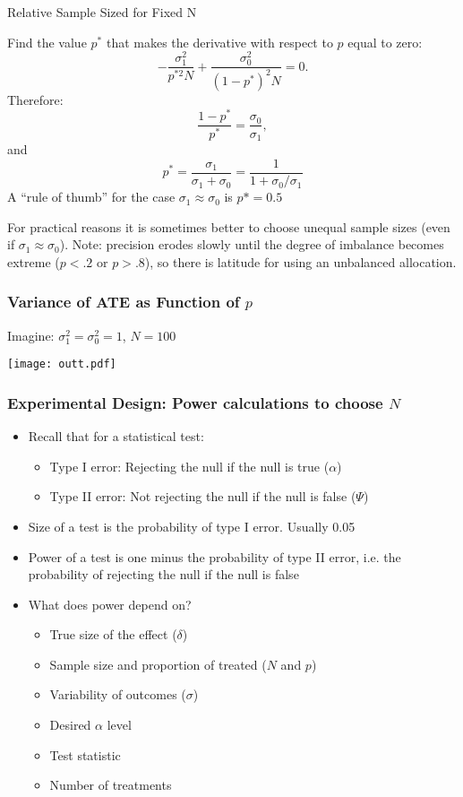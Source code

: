 \documentclass{beamer}
\numberwithin{equation}{section}
\begin{document}
\begin{frame}{Relative Sample Sized for Fixed N}

Find the value $p^*$ that makes the derivative with respect to $p$ equal
to zero: \[
-\frac{\sigma^2_1}{p^{*2} N}+\frac{\sigma^2_0}{(1-p^*)^2 N}=0.
\] Therefore: \[
\frac{1-p^*}{p^*} = \frac{\sigma_0}{\sigma_1},
\] and \[
p^* = \frac{\sigma_1}{\sigma_1+\sigma_0}=\frac{1}{1+\sigma_0/\sigma_1}
\] A ``rule of thumb'' for the case $\sigma_1\approx \sigma_0$ is
$p*=0.5$

For practical reasons it is sometimes better to choose unequal sample
sizes (even if $\sigma_1\approx \sigma_0$). Note: precision erodes
slowly until the degree of imbalance becomes extreme ($p < .2$ or
$p>.8$), so there is latitude for using an unbalanced allocation.

\end{frame}

\begin{frame}
\frametitle{Variance of ATE as Function of $p$}

Imagine: $\sigma^2_1=\sigma^2_0=1$, $N=100$
\begin{center}
\texttt{[image: outt.pdf]}\\
\end{center}
\end{frame}



 \begin{frame}
\frametitle{Experimental Design: Power calculations to choose $N$}
\begin{itemize}
\item Recall that for a statistical test:
\begin{itemize}\medskip
\item Type I error: Rejecting the null if
  the null is true ($\alpha$)\medskip
\item Type II error: Not rejecting the null if
  the null is false ($\Psi$)
\end{itemize}\bigskip
\item Size of a test is the probability of type I error. Usually 0.05\bigskip
\item Power of a test is one minus the probability of type II error, i.e. the probability of rejecting the null if the null is false\bigskip
\item What does power depend on? \pause
\begin{itemize}
  \item True size of the effect ($\delta$)
  \item Sample size and proportion of treated ($N$ and $p$)
  \item Variability of outcomes ($\sigma$)
  \item Desired $\alpha$ level
  \item Test statistic
  \item Number of treatments
\end{itemize}

\end{itemize}
\end{frame}
\end{document}
